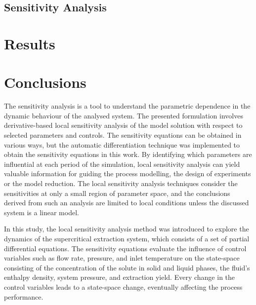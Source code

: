 \documentclass[a4paper,fleqn]{cas-dc}
\begin{document}
%

\subsection{Sensitivity Analysis} \label{CH: Sensitivity_Analysis}


%

\section{Results}


\section{Conclusions} \label{CH: Conclusion}

The sensitivity analysis is a tool to understand the parametric dependence in the dynamic behaviour of the analysed system. The presented formulation involves derivative-based local sensitivity analysis of the model solution with respect to selected parameters and controls. The sensitivity equations can be obtained in various ways, but the automatic differentiation technique was implemented to obtain the sensitivity equations in this work. By identifying which parameters are influential at each period of the simulation, local sensitivity analysis can yield valuable information for guiding the process modelling, the design of experiments or the model reduction. The local sensitivity analysis techniques consider the sensitivities at only a small region of parameter space, and the conclusions derived from such an analysis are limited to local conditions unless the discussed system is a linear model.

In this study, the local sensitivity analysis method was introduced to explore the dynamics of the supercritical extraction system, which consists of a set of partial differential equations. The sensitivity equations evaluate the influence of control variables such as flow rate, pressure, and inlet temperature on the state-space consisting of the concentration of the solute in solid and liquid phases, the fluid's enthalpy density, system pressure, and extraction yield. Every change in the control variables leads to a state-space change, eventually affecting the process performance. 
\end{document}
